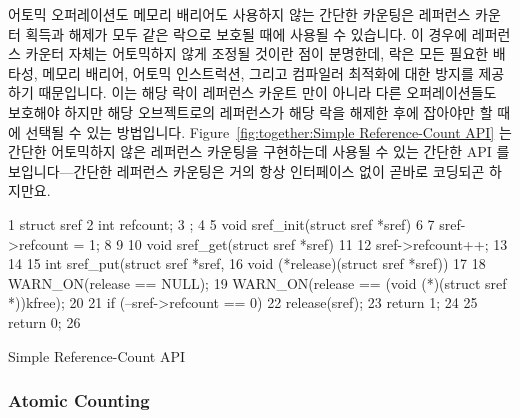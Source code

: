 어토믹 오퍼레이션도 메모리 배리어도 사용하지 않는 간단한 카운팅은 레퍼런스
카운터 획득과 해제가 모두 같은 락으로 보호될 때에 사용될 수 있습니다.
이 경우에 레퍼런스 카운터 자체는 어토믹하지 않게 조정될 것이란 점이 분명한데,
락은 모든 필요한 배타성, 메모리 배리어, 어토믹 인스트럭션, 그리고 컴파일러
최적화에 대한 방지를 제공하기 때문입니다.
이는 해당 락이 레퍼런스 카운트 만이 아니라 다른 오퍼레이션들도 보호해야 하지만
해당 오브젝트로의 레퍼런스가 해당 락을 해제한 후에 잡아야만 할 때에 선택될 수
있는 방법입니다.
Figure~\ref{fig:together:Simple Reference-Count API} 는 간단한 어토믹하지 않은
레퍼런스 카운팅을 구현하는데 사용될 수 있는 간단한 API 를 보입니다---간단한
레퍼런스 카운팅은 거의 항상 인터페이스 없이 곧바로 코딩되곤 하지만요.
\iffalse

Simple counting, with neither atomic operations nor memory barriers,
can be used when the reference-counter acquisition and release are
both protected by the same lock.
In this case, it should be clear that the reference count itself
may be manipulated non-atomically, because the lock provides any
necessary exclusion, memory barriers, atomic instructions, and disabling
of compiler optimizations.
This is the method of choice when the lock is required to protect
other operations in addition to the reference count, but where
a reference to the object must be held after the lock is released.
Listing~\ref{lst:together:Simple Reference-Count API} shows a simple
API that might be used to implement simple non-atomic reference
counting---although simple reference counting is almost always
open-coded instead.
\fi

\begin{listing}[tbp]
{ \scriptsize
\begin{verbbox}
  1 struct sref {
  2   int refcount;
  3 };
  4
  5 void sref_init(struct sref *sref)
  6 {
  7   sref->refcount = 1;
  8 }
  9
 10 void sref_get(struct sref *sref)
 11 {
 12   sref->refcount++;
 13 }
 14
 15 int sref_put(struct sref *sref,
 16              void (*release)(struct sref *sref))
 17 {
 18   WARN_ON(release == NULL);
 19   WARN_ON(release == (void (*)(struct sref *))kfree);
 20
 21   if (--sref->refcount == 0) {
 22     release(sref);
 23     return 1;
 24   }
 25   return 0;
 26 }
\end{verbbox}
}
\centering
\theverbbox
\caption{Simple Reference-Count API}
\label{lst:together:Simple Reference-Count API}
\end{listing}

\subsubsection{Atomic Counting}
\label{sec:together:Atomic Counting}

